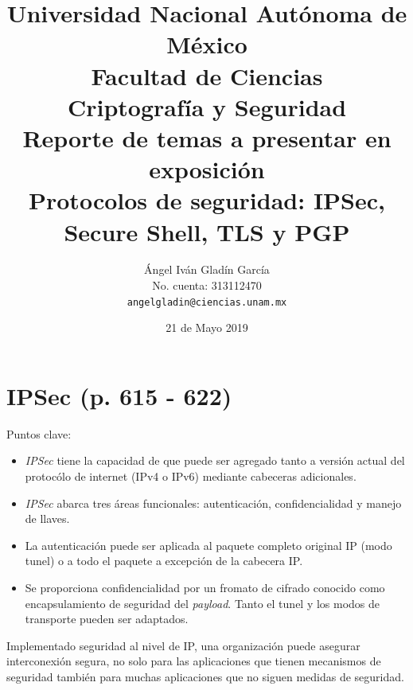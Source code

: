 \documentclass[11pt,letterpaper]{article}
\begin{document}
\title{
    \vspace{-2cm}
        Universidad Nacional Autónoma de México\\
        Facultad de Ciencias\\
        Criptografía y Seguridad\\
    \vspace{.5cm}
    \large
        \textbf{Reporte de temas a presentar en exposición}\\
        \textbf{Protocolos de seguridad: IPSec, Secure Shell, TLS y PGP}
}
\author{
    Ángel Iván Gladín García\\
    No. cuenta: 313112470\\
    \texttt{angelgladin@ciencias.unam.mx}
}
\date{21 de Mayo 2019}
\maketitle

\newtheorem{theorem}{Teorema}
\newtheorem{example}{Ejemplo}
\newtheorem{corollary}{Corolario}
\newtheorem{lemma}{Lemma}
\newtheorem{definition}{Definición}
\newtheorem{prop}{Proposición}


\section{IPSec (p. 615 - 622)}

Puntos clave:
\begin{itemize}
    \item \textit{IPSec} tiene la capacidad de que puede ser agregado tanto a versión actual del
    protocólo de internet (IPv4 o IPv6) mediante cabeceras adicionales.
    \item \textit{IPSec} abarca tres áreas funcionales: autenticación, confidencialidad y manejo
    de llaves.
    \item La autenticación puede ser aplicada al paquete completo original IP (modo tunel) o a todo
    el paquete a excepción de la cabecera IP.
    \item Se proporciona confidencialidad por un fromato de cifrado conocido como encapsulamiento de
    seguridad del \textit{payload}. Tanto el tunel y los modos de transporte pueden ser adaptados.
\end{itemize}
Implementado seguridad al nivel de IP, una organización puede asegurar interconexión segura, no solo
para las aplicaciones que tienen mecanismos de seguridad también para muchas aplicaciones que no
siguen medidas de seguridad.
\end{document}
